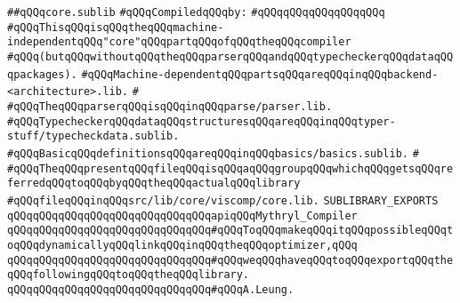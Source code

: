 \label{src/lib/compiler/core.sublib}
\verb|##qQQqcore.sublib|\newline
\newline
\verb|#qQQqCompiledqQQqby:|\newline
\verb|#qQQqqQQqqQQqqQQqqQQq|\newline
\newline
\newline
\newline
\verb|#qQQqThisqQQqisqQQqtheqQQqmachine-independentqQQq"core"qQQqpartqQQqofqQQqtheqQQqcompiler|\newline
\verb|#qQQq(butqQQqwithoutqQQqtheqQQqparserqQQqandqQQqtypecheckerqQQqdataqQQqpackages).|\newline
\verb|#qQQqMachine-dependentqQQqpartsqQQqareqQQqinqQQqbackend-<architecture>.lib.|\newline
\verb|#|\newline
\verb|#qQQqTheqQQqparserqQQqisqQQqinqQQqparse/parser.lib.|\newline
\verb|#qQQqTypecheckerqQQqdataqQQqstructuresqQQqareqQQqinqQQqtyper-stuff/typecheckdata.sublib.|\newline
\verb|#qQQqBasicqQQqdefinitionsqQQqareqQQqinqQQqbasics/basics.sublib.|\newline
\verb|#|\newline
\verb|#qQQqTheqQQqpresentqQQqfileqQQqisqQQqaqQQqgroupqQQqwhichqQQqgetsqQQqreferredqQQqtoqQQqbyqQQqtheqQQqactualqQQqlibrary|\newline
\verb|#qQQqfileqQQqinqQQqsrc/lib/core/viscomp/core.lib.|\newline
\newline
\newline
\newline
\verb|SUBLIBRARY_EXPORTS|\newline
\newline
\verb|qQQqqQQqqQQqqQQqqQQqqQQqqQQqqQQqapiqQQqMythryl_Compiler|\newline
\newline
\verb|qQQqqQQqqQQqqQQqqQQqqQQqqQQqqQQq#qQQqToqQQqmakeqQQqitqQQqpossibleqQQqtoqQQqdynamicallyqQQqlinkqQQqinqQQqtheqQQqoptimizer,qQQq|\newline
\verb|qQQqqQQqqQQqqQQqqQQqqQQqqQQqqQQq#qQQqweqQQqhaveqQQqtoqQQqexportqQQqtheqQQqfollowingqQQqtoqQQqtheqQQqlibrary.|\newline
\verb|qQQqqQQqqQQqqQQqqQQqqQQqqQQqqQQq#qQQqA.Leung.|\newline
\newline
